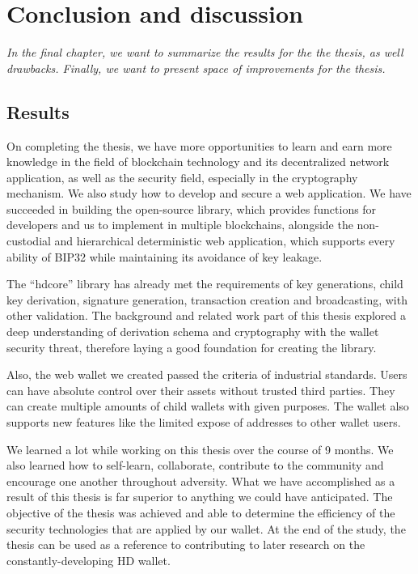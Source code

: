 \chapter{Conclusion and discussion} \label{chap:conclusion}
\textit{In the final chapter, we want to summarize the results for the the thesis, as well drawbacks.
Finally, we want to present space of improvements for the thesis.}

\minitoc

\section{Results}

On completing the thesis, we have more opportunities to learn and earn more knowledge in the field of blockchain technology and its decentralized network application, as well as the security field, especially in the cryptography mechanism. We also study how to develop and secure a web application. We have succeeded in building the open-source library, which provides functions for developers and us to implement in multiple blockchains, alongside the non-custodial and hierarchical deterministic web application, which supports every ability of BIP32 while maintaining its avoidance of key leakage.


The “hdcore” library has already met the requirements of key generations, child key derivation, signature generation, transaction creation and broadcasting, with other validation. The background and related work part of this thesis explored a deep understanding of derivation schema and cryptography with the wallet security threat, therefore laying a good foundation for creating the library.


Also, the web wallet we created passed the criteria of industrial standards. Users can have absolute control over their assets without trusted third parties. They can create multiple amounts of child wallets with given purposes. The wallet also supports new features like the limited expose of addresses to other wallet users.


We learned a lot while working on this thesis over the course of 9 months. We also learned how to self-learn, collaborate, contribute to the community and encourage one another throughout adversity. What we have accomplished as a result of this thesis is far superior to anything we could have anticipated. The objective of the thesis was achieved and able to determine the efficiency of the security technologies that are applied by our wallet. At the end of the study, the thesis can be used as a reference to contributing to later research on the constantly-developing HD wallet.

